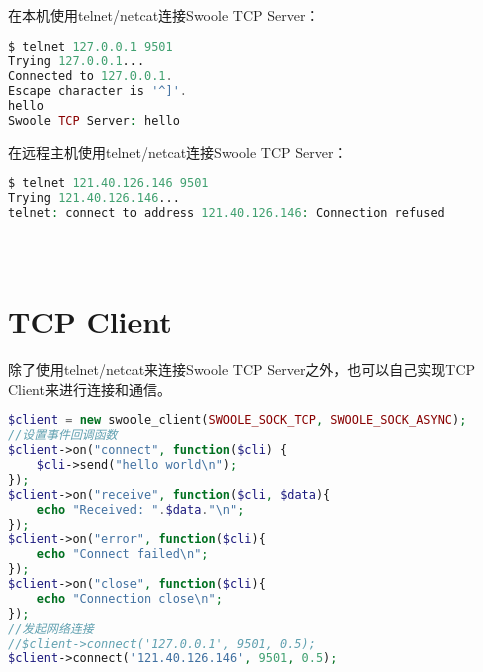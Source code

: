 \begin{compactitem}
\item 在本机使用telnet/netcat连接Swoole TCP Server：

\begin{lstlisting}[language=PHP]
$ telnet 127.0.0.1 9501
Trying 127.0.0.1...
Connected to 127.0.0.1.
Escape character is '^]'.
hello
Swoole TCP Server: hello
\end{lstlisting}

\item 在远程主机使用telnet/netcat连接Swoole TCP Server：

\begin{lstlisting}[language=PHP]
$ telnet 121.40.126.146 9501
Trying 121.40.126.146...
telnet: connect to address 121.40.126.146: Connection refused
\end{lstlisting}

\end{compactitem}




\begin{lstlisting}[language=PHP]

\end{lstlisting}




\begin{lstlisting}[language=PHP]

\end{lstlisting}




\begin{lstlisting}[language=PHP]

\end{lstlisting}







\section{TCP Client}

除了使用telnet/netcat来连接Swoole TCP Server之外，也可以自己实现TCP Client来进行连接和通信。


\begin{lstlisting}[language=PHP]
$client = new swoole_client(SWOOLE_SOCK_TCP, SWOOLE_SOCK_ASYNC);
//设置事件回调函数
$client->on("connect", function($cli) {
    $cli->send("hello world\n");
});
$client->on("receive", function($cli, $data){
    echo "Received: ".$data."\n";
});
$client->on("error", function($cli){
    echo "Connect failed\n";
});
$client->on("close", function($cli){
    echo "Connection close\n";
});
//发起网络连接
//$client->connect('127.0.0.1', 9501, 0.5);
$client->connect('121.40.126.146', 9501, 0.5);
\end{lstlisting}

